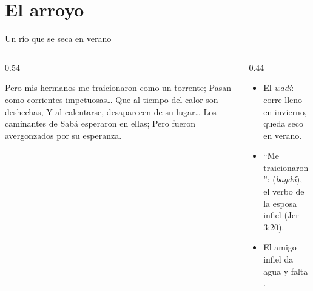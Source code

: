 \section{El arroyo}

\begin{frame}{Un río que se seca en verano}
\begin{columns}[t,onlytextwidth]
\begin{column}{0.54\textwidth}
\begin{cita}Pero mis hermanos me traicionaron como un torrente; Pasan como corrientes impetuosas\ldots{} Que al tiempo del calor son deshechas, Y al calentarse, desaparecen de su lugar\ldots{} Los caminantes de Sabá esperaron en ellas; Pero fueron avergonzados por su esperanza.\end{cita}
\end{column}
\begin{column}{0.44\textwidth}\small
\begin{itemize}
\item El \emph{wadi}: corre lleno en invierno, queda seco en verano.
\item ``Me traicionaron'':  (\emph{bagdú}), el verbo de la esposa infiel (Jer 3:20).
\item El amigo infiel da agua  y falta .
\end{itemize}
\end{column}
\end{columns}
\end{frame}


